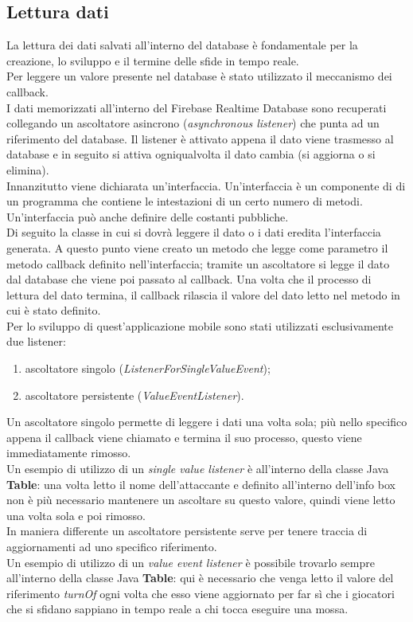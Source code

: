 \documentclass[a4paper,11pt,twoside,openright]{report}
\begin{document}
\subsection{Lettura dati}
La lettura dei dati salvati all'interno del database è fondamentale per la creazione, lo sviluppo e il termine delle sfide in tempo reale.\\
Per leggere un valore presente nel database è stato utilizzato il meccanismo dei callback.\\
I dati memorizzati all'interno del Firebase Realtime Database sono recuperati collegando un ascoltatore asincrono (\textit{asynchronous listener}) che punta ad un riferimento del database. Il listener è attivato appena il dato viene trasmesso al database e in seguito si attiva ogniqualvolta il dato cambia (si aggiorna o si elimina).\\
Innanzitutto viene dichiarata un'interfaccia. Un'interfaccia è un componente di di un programma che contiene le intestazioni di un certo numero di metodi. Un'interfaccia può anche definire delle costanti pubbliche\cite{9}.\\ 
Di seguito la classe in cui si dovrà leggere il dato o i dati eredita l'interfaccia generata. A questo punto viene creato un metodo che legge come parametro il metodo callback definito nell'interfaccia; tramite un ascoltatore si legge il dato dal database che viene poi passato al callback. Una volta che il processo di lettura del dato termina, il callback rilascia il valore del dato letto nel metodo in cui è stato definito.\\
Per lo sviluppo di quest'applicazione mobile sono stati utilizzati esclusivamente due listener:

\begin{enumerate}
\item ascoltatore singolo (\textit{ListenerForSingleValueEvent});

\item ascoltatore persistente (\textit{ValueEventListener}).
\end{enumerate}

Un ascoltatore singolo permette di leggere i dati una volta sola; più nello specifico appena il callback viene chiamato e termina il suo processo, questo viene immediatamente rimosso.\\
Un esempio di utilizzo di un \textit{single value listener} è all'interno della classe Java \textbf{Table}: una volta letto il nome dell'attaccante e definito all'interno dell'info box non è più necessario mantenere un ascoltare su questo valore, quindi viene letto una volta sola e poi rimosso.\\
In maniera differente un ascoltatore persistente serve per tenere traccia di aggiornamenti ad uno specifico riferimento.\\
Un esempio di utilizzo di un \textit{value event listener} è possibile trovarlo sempre all'interno della classe Java \textbf{Table}: qui è necessario che venga letto il valore del riferimento \textit{turnOf} ogni volta che esso viene aggiornato per far sì che i giocatori che si sfidano sappiano in tempo reale a chi tocca eseguire una mossa.
\end{document}
